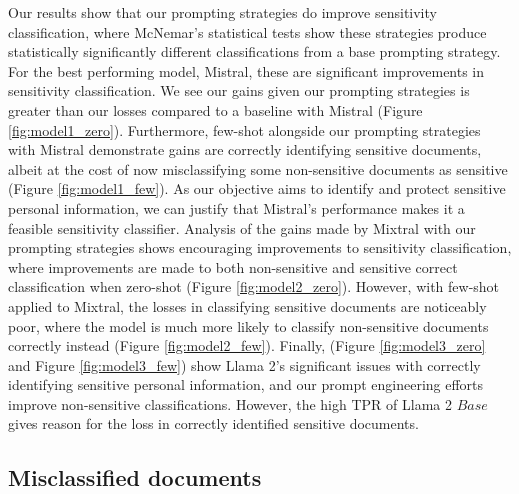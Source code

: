 Our results show that our prompting strategies do improve sensitivity classification, where McNemar’s statistical tests show these strategies produce statistically significantly different classifications from a base prompting strategy. For the best performing model, Mistral, these are significant improvements in sensitivity classification. We see our gains given our prompting strategies is greater than our losses compared to a baseline with Mistral (Figure \ref{fig:model1_zero}). Furthermore, few-shot alongside our prompting strategies with Mistral demonstrate gains are correctly identifying sensitive documents, albeit at the cost of now misclassifying some non-sensitive documents as sensitive (Figure \ref{fig:model1_few}). As our objective aims to identify and protect sensitive personal information, we can justify that Mistral’s performance makes it a feasible sensitivity classifier. Analysis of the gains made by Mixtral with our prompting strategies shows encouraging improvements to sensitivity classification, where improvements are made to both non-sensitive and sensitive correct classification when zero-shot (Figure \ref{fig:model2_zero}). However, with few-shot applied to Mixtral, the losses in classifying sensitive documents are noticeably poor, where the model is much more likely to classify non-sensitive documents correctly instead (Figure \ref{fig:model2_few}). Finally, (Figure \ref{fig:model3_zero} and Figure \ref{fig:model3_few}) show Llama 2’s significant issues with correctly identifying sensitive personal information, and our prompt engineering efforts improve non-sensitive classifications. However, the high TPR of Llama 2 $Base$ gives reason for the loss in correctly identified sensitive documents.

\subsection{Misclassified documents} 

